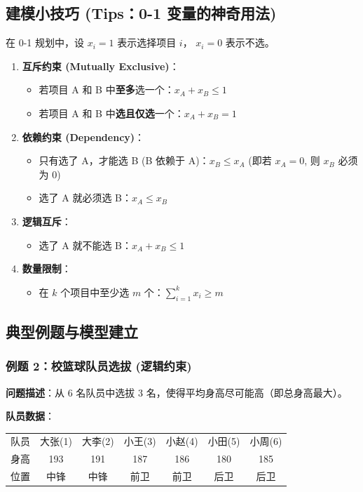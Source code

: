 \documentclass[a4paper,12pt]{ctexart} %
\begin{document}
	\subsection{建模小技巧 (Tips：0-1 变量的神奇用法)}
	
	在 0-1 规划中，设 $x_i = 1$ 表示选择项目 $i$， $x_i = 0$ 表示不选。
	
	\begin{enumerate}
		\item \textbf{互斥约束 (Mutually Exclusive)}：
		\begin{itemize}
			\item 若项目 A 和 B 中\textbf{至多}选一个：$x_A + x_B \le 1$
			\item 若项目 A 和 B 中\textbf{选且仅选}一个：$x_A + x_B = 1$
		\end{itemize}
		\item \textbf{依赖约束 (Dependency)}：
		\begin{itemize}
			\item 只有选了 A，才能选 B (B 依赖于 A)：$x_B \le x_A$ (即若 $x_A=0$, 则 $x_B$ 必须为 0)
			\item 选了 A 就必须选 B：$x_A \le x_B$ 
		\end{itemize}
		\item \textbf{逻辑互斥}：
		\begin{itemize}
			\item 选了 A 就不能选 B：$x_A + x_B \le 1$
		\end{itemize}
		\item \textbf{数量限制}：
		\begin{itemize}
			\item 在 $k$ 个项目中至少选 $m$ 个：$\sum_{i=1}^{k} x_i \ge m$
		\end{itemize}
	\end{enumerate}
	
	\subsection{典型例题与模型建立}
	
	\subsubsection{例题 2：校篮球队员选拔 (逻辑约束)}
	\textbf{问题描述}：从 6 名队员中选拔 3 名，使得平均身高尽可能高（即总身高最大）。
	
	\textbf{队员数据}：
	\begin{table}[H]
		\centering
		\small
		\begin{tabular}{ccccccc}
			\toprule
			队员 & 大张(1) & 大李(2) & 小王(3) & 小赵(4) & 小田(5) & 小周(6) \\
			身高 & 193 & 191 & 187 & 186 & 180 & 185 \\
			位置 & 中锋 & 中锋 & 前卫 & 前卫 & 后卫 & 后卫 \\
			\bottomrule
		\end{tabular}
	\end{table}
	
\end{document}
